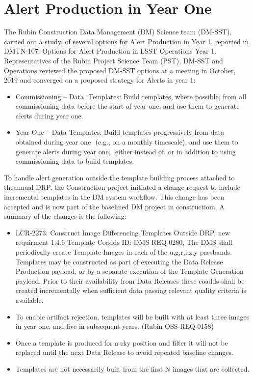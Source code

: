 \section{Alert Production in Year One}
\label{sec:pp}

The Rubin Construction Data Management (DM) Science team (DM-SST), carried out a study, of several options for Alert Production in Year 1, reported in DMTN-107: Options for Alert Production in LSST Operations Year 1.  
Representatives of the Rubin Project Science Team (PST), DM-SST and Operations reviewed the proposed DM-SST options at a meeting in October, 2019 and converged on a proposed strategy for Alerts in year 1:

\begin{itemize}
\item Commissioning – Data  Templates: Build templates, where possible, from all commissioning data before the start of year one, and use them to generate alerts during year one. 
\item Year One – Data Templates: Build templates progressively from data obtained during year one  (e.g., on a monthly timescale), and use them to generate alerts during year one,  either instead of, or in addition to using commissioning data to build templates.
\end{itemize}

To handle alert generation outside the template building process attached to theannual DRP, the Construction project initiated a change request to include incremental templates in the DM system workflow. This change has been accepted and is now part of the baselined DM project in constructiom. A summary of the changes is the following:

\begin{itemize} 
\item LCR-2273: Construct Image Differencing Templates Outside DRP, new requirment 1.4.6 Template Coadds ID: DMS-REQ-0280, The DMS shall periodically create Template Images in each of the u,g,r,i,z,y passbands. Templates may be constructed as part of executing the Data Release Production payload, or by a separate execution of the Template Generation payload. Prior to their availability from Data Releases these coadds shall be created incrementally when sufficient data passing relevant quality criteria is available. 
\item To enable artifact rejection, templates will be built with at least three images in year one, and five in subsequent years.  (Rubin OSS-REQ-0158)
\item Once a template is produced for a sky position and filter it will not be replaced until the next Data Release to avoid repeated baseline changes.
\item Templates are not necessarily built from the first N images that are collected.
\end{itemize}

